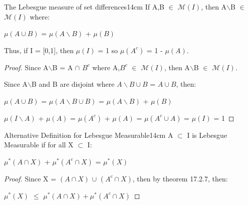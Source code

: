     \vspace{0.5cm}



    \begin{wtheorem}{The Lebesgue measure of set differences}{14cm}
        If A,B $\in$ $\mathcal{M}(I)$, then
        A$\backslash$B $\in$ $\mathcal{M}(I)$ where:

        \hspace{0.5cm}
        $\mu(A \cup B)$
        = $\mu(A \backslash B)$ + $\mu(B)$

        Thus, if I = [0,1], then $\mu(I)$ = 1 so $\mu(A^c)$ = 1 - $\mu(A)$.
    \end{wtheorem}

    \begin{proof}
        Since A$\backslash$B = A $\cap$ $B^c$ where
        A,$B^c$ $\in$ $\mathcal{M}(I)$, then
        A$\backslash$B $\in$ $\mathcal{M}(I)$.

        Since A$\backslash$B and B are disjoint where
        $A \backslash B \cup B$ = $A \cup B$, then:

        \hspace{0.5cm}
        $\mu(A \cup B)$
        = $\mu(A \backslash B \cup B)$
        = $\mu(A \backslash B)$ + $\mu(B)$

        \hspace{0.5cm}
        $\mu(I \backslash A)$ + $\mu(A)$
        = $\mu(A^c)$ + $\mu(A)$
        = $\mu(A^c \cup A)$
        = $\mu(I)$
        = 1
    \end{proof}

    \newpage



    \begin{wtheorem}{Alternative Definition for Lebesgue Measurable}{14cm}
        A $\subset$ I is Lebesgue Measurable if for all X $\subset$ I:

        \hspace{0.5cm}
        $\mu^*(A \cap X)$ + $\mu^*(A^c \cap X)$ = $\mu^*(X)$
    \end{wtheorem}

    \begin{proof}
        Since X = $(A \cap X)$ $\cup$ $(A^c \cap X)$, then
        by {\color{red} theorem 17.2.7}, then:

        \hspace{0.5cm}
        $\mu^*(X)$ $\leq$ $\mu^*(A \cap X) + \mu^*(A^c \cap X)$

        
    \end{proof}

